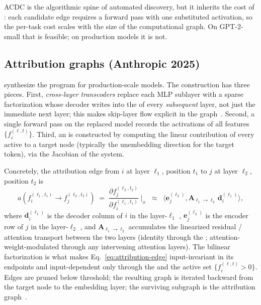ACDC is the algorithmic spine of automated  discovery, but it
inherits the cost of : each candidate edge requires
a forward pass with one substituted activation, so the per-task cost
scales with the size of the computational graph. On GPT-2-small that
is feasible; on production models it is not.

\subsection{Attribution graphs (Anthropic 2025)}
\label{sec:circuit-attribution}

\citet{lindsey2025-circuit-tracing} synthesize the program for
production-scale models. The construction has three pieces. First,
\emph{cross-layer transcoders} replace each MLP sublayer with a sparse
factorization whose decoder writes into the  of every
\emph{subsequent} layer, not just the immediate next layer; this makes
skip-layer  flow explicit in the
graph~\citep{dunefsky2024-transcoders}. Second, a single forward pass
on the replaced model records the activations of all 
features $\{f_i^{(\ell, t)}\}$. Third, an \emph{} is
constructed by computing the linear contribution of every active
 to a target node (typically the unembedding direction for
the target token), via the Jacobian of the 
system.

Concretely, the attribution edge from  $i$ at layer $\ell_1$,
position $t_1$ to  $j$ at layer $\ell_2$, position $t_2$ is
\begin{equation}
  a\!\left(f_i^{(\ell_1, t_1)} \to f_j^{(\ell_2, t_2)}\right)
  \;=\;
  \frac{\partial f_j^{(\ell_2, t_2)}}{\partial f_i^{(\ell_1, t_1)}}
  \;\bigg|_{x}
  \;\;\approx\;\;
  \big\langle \mathbf{e}_j^{(\ell_2)},
              \mathbf{A}_{\ell_1 \to \ell_2}\,
              \mathbf{d}_i^{(\ell_1)} \big\rangle,
  \label{eq:attribution-edge}
\end{equation}
where $\mathbf{d}_i^{(\ell_1)}$ is the decoder column of  $i$
in the layer-$\ell_1$ , $\mathbf{e}_j^{(\ell_2)}$ is the
encoder row of  $j$ in the layer-$\ell_2$ , and
$\mathbf{A}_{\ell_1 \to \ell_2}$ accumulates the linearized residual /
attention transport between the two layers (identity through the
; attention-weight-modulated through any intervening
attention layers). The bilinear factorization is what makes
Eq.~\eqref{eq:attribution-edge} input-invariant in its endpoints and
input-dependent only through the  and the active set
$\{f_i^{(\ell, t)} > 0\}$. Edges are pruned below threshold; the
resulting graph is iterated backward from the target node to the
embedding layer; the surviving subgraph is the attribution
graph~\citep{lindsey2025-circuit-tracing}.

